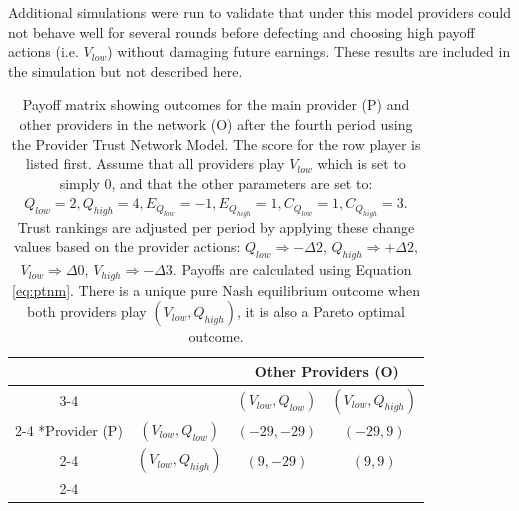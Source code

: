 \documentclass{article}
\begin{document}
Additional simulations were run to validate that under this model providers could not behave well for several rounds before defecting and choosing high payoff actions (i.e. $V_{low}$) without damaging future earnings. These results are included in the simulation but not described here.

\begin{table}[H]
\centering
  \setlength{\extrarowheight}{2pt}
  \begin{tabular}{*{4}{c|}}
    \multicolumn{2}{c}{} & \multicolumn{2}{c}{Other Providers (O)}\\\cline{3-4}
    \multicolumn{1}{c}{} &  & $(V_{low}, Q_{low})$  & $(V_{low}, Q_{high})$ \\\cline{2-4}
    \multirow{2}*{Provider (P)}  & $(V_{low}, Q_{low})$ & $(-29, -29)$ & $(-29, 9)$ \\\cline{2-4}
    & $(V_{low}, Q_{high})$ & $(9, -29)$ & $(9, 9)$ \\\cline{2-4}
  \end{tabular}
\caption{Payoff matrix showing outcomes for the main provider (P) and other providers in the network (O) after the fourth period using the Provider Trust Network Model. The score for the row player is listed first. Assume that all providers play $V_{low}$ which is set to simply $0$, and that the other parameters are set to: $Q_{low} = 2, Q_{high} = 4, E_{Q_{low}} = -1, E_{Q_{high}} = 1, C_{Q_{low}} = 1, C_{Q_{high}} = 3$. Trust rankings are adjusted per period by applying these change values based on the provider actions: $Q_{low} \Rightarrow -\Delta 2$, $Q_{high} \Rightarrow +\Delta 2$, $V_{low} \Rightarrow \Delta 0$, $V_{high} \Rightarrow -\Delta 3$. Payoffs are calculated using Equation \ref{eq:ptnm}. There is a unique pure Nash equilibrium outcome when both providers play $(V_{low}, Q_{high})$, it is also a Pareto optimal outcome.}
\label{table:ptnlow}
\end{table}
\end{document}
